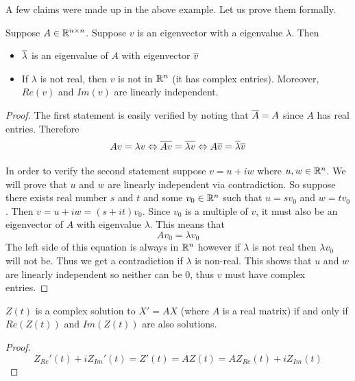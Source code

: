 A few claims were made up in the above example. Let us prove them formally.
\begin{lemma}
Suppose $A \in \mathbb{R}^{n \times n}$. Suppose $v$ is an eigenvector with a eigenvalue $\lambda$. Then
\begin{itemize}
    \item $\overline{\lambda}$ is an eigenvalue of $A$ with eigenvector $\overline{v}$
    \item If $\lambda$ is not real, then $v$ is not in $\mathbb{R}^{n}$ (it has complex entries). Moreover, $Re(v)$ and $Im(v)$ are linearly independent.
\end{itemize}
\end{lemma}
\begin{proof}
The first statement is easily verified by noting that $\overline{A} = A$ since $A$ has real entries. Therefore
$$ Av = \lambda v \Leftrightarrow \overline{Av} = \overline{\lambda v} \Leftrightarrow A\overline{v} = \overline{\lambda} \overline{v} $$

In order to verify the second statement suppose $v = u + iw$ where $u, w \in \mathbb{R}^n$. We will prove that $u$ and $w$ are linearly independent via contradiction. So suppose there exists real number $s$ and $t$ and some $v_0 \in \mathbb{R}^n$ such that $u = s v_0$ and $w = t v_0$. Then $v = u + iw = (s + it) v_0$. Since $v_0$ is a multiple of $v$, it must also be an eigenvector of $A$ with eigenvalue $\lambda$. This means that
$$ Av_0 = \lambda v_0 $$
The left side of this equation is always in $\mathbb{R}^n$ however if $\lambda$ is not real then $\lambda v_0$ will not be. Thus we get a contradiction if $\lambda$ is non-real. This shows that $u$ and $w$ are linearly independent so neither can be 0, thus $v$ must have complex entries.
\end{proof}
\begin{lemma}
$Z(t)$ is a complex solution to $X' = AX$ (where $A$ is a real matrix) if and only if $Re(Z(t))$ and $Im(Z(t))$ are also solutions.
\end{lemma}
\begin{proof}
$$ Z_{Re}'(t) + i Z_{Im}'(t) = Z'(t) = A Z(t) = A Z_{Re}(t) + i Z_{Im}(t) $$
\end{proof}